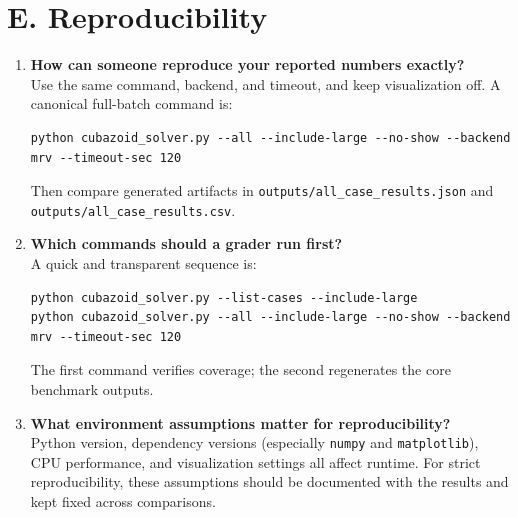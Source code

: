 \documentclass[11pt]{article}
\begin{document}
\section*{E. Reproducibility}
\begin{enumerate}[leftmargin=*,label=\textbf{Q\arabic*.},start=18]
\item \textbf{How can someone reproduce your reported numbers exactly?}\\
Use the same command, backend, and timeout, and keep visualization off. A canonical full-batch command is:
\begin{verbatim}
python cubazoid_solver.py --all --include-large --no-show --backend mrv --timeout-sec 120
\end{verbatim}
Then compare generated artifacts in \texttt{outputs/all\_case\_results.json} and \texttt{outputs/all\_case\_results.csv}.

\item \textbf{Which commands should a grader run first?}\\
A quick and transparent sequence is:
\begin{verbatim}
python cubazoid_solver.py --list-cases --include-large
python cubazoid_solver.py --all --include-large --no-show --backend mrv --timeout-sec 120
\end{verbatim}
The first command verifies coverage; the second regenerates the core benchmark outputs.

\item \textbf{What environment assumptions matter for reproducibility?}\\
Python version, dependency versions (especially \texttt{numpy} and \texttt{matplotlib}), CPU performance, and visualization settings all affect runtime. For strict reproducibility, these assumptions should be documented with the results and kept fixed across comparisons.
\end{enumerate}
\end{document}
